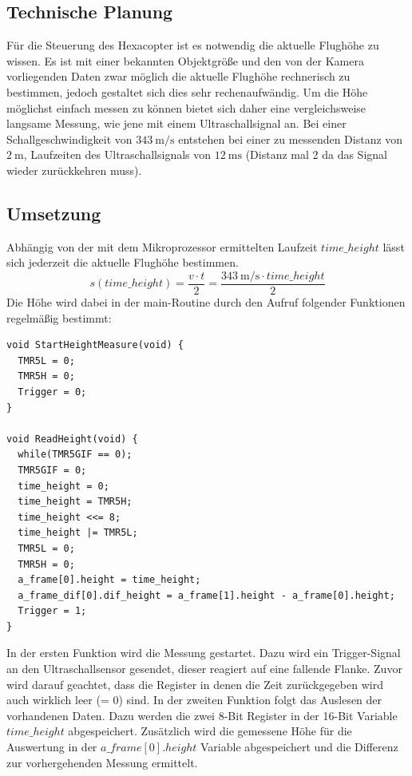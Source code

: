   \subsection{Technische Planung}
  Für die Steuerung des Hexacopter ist es notwendig die aktuelle Flughöhe zu wissen.
  Es ist mit einer bekannten Objektgröße und den von der Kamera vorliegenden Daten zwar möglich die aktuelle Flughöhe rechnerisch zu bestimmen,
  jedoch gestaltet sich dies sehr rechenaufwändig. Um die Höhe möglichst einfach messen zu können bietet sich daher eine vergleichsweise langsame Messung,
  wie jene mit einem Ultraschallsignal an.
  Bei einer Schallgeschwindigkeit von $\SI{343}{\meter\per\second}$ entstehen bei einer zu messenden Distanz von $\SI{2}{\meter}$,
  Laufzeiten des Ultraschallsignals von \ca $\SI{12}{\milli\second}$ (Distanz mal 2 da das Signal wieder zurückkehren muss).

  \subsection{Umsetzung}
  Abhängig von der mit dem Mikroprozessor ermittelten Laufzeit $time\_height$ lässt sich jederzeit die aktuelle Flughöhe bestimmen.
  \[
  s(time\_height) = \frac{v \cdot t}{2} = \frac{\SI{343}{\meter\per\second} \cdot time\_height}{2}
  \]
  Die Höhe wird dabei in der main-Routine durch den Aufruf folgender Funktionen regelmäßig bestimmt:
  \lstset{language = c}
  \begin{lstlisting}
void StartHeightMeasure(void) {
  TMR5L = 0;
  TMR5H = 0;
  Trigger = 0;
}

void ReadHeight(void) {
  while(TMR5GIF == 0);
  TMR5GIF = 0;
  time_height = 0;
  time_height = TMR5H;
  time_height <<= 8;
  time_height |= TMR5L;
  TMR5L = 0;
  TMR5H = 0;
  a_frame[0].height = time_height;
  a_frame_dif[0].dif_height = a_frame[1].height - a_frame[0].height;
  Trigger = 1;
}
  \end{lstlisting}

  In der ersten Funktion wird die Messung gestartet. Dazu wird ein Trigger-Signal an den Ultraschallsensor gesendet, dieser reagiert auf eine fallende Flanke.
  Zuvor wird darauf geachtet, dass die Register in denen die Zeit zurückgegeben wird auch wirklich leer (= 0) sind.
  In der zweiten Funktion folgt das Auslesen der vorhandenen Daten. Dazu werden die zwei 8-Bit Register in der 16-Bit Variable $time\_height$ abgespeichert.
  Zusätzlich wird die gemessene Höhe für die Auswertung in der $a\_frame[0].height$ Variable abgespeichert und die Differenz zur vorhergehenden Messung ermittelt.

